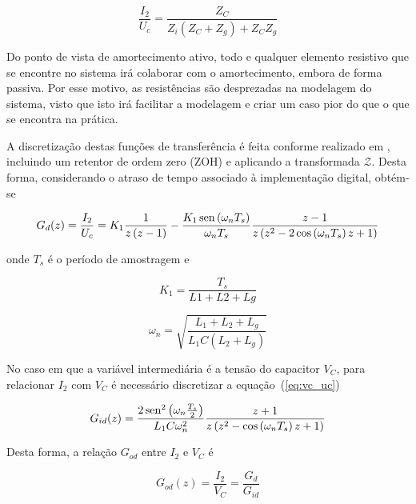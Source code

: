     \begin{equation}
        \frac{I_2}{U_c} = \frac{Z_C}{Z_i \left( Z_C + Z_g \right) + Z_C Z_g}
    \end{equation}

    Do ponto de vista de amortecimento ativo, todo e qualquer elemento resistivo
    que se encontre no sistema irá colaborar com o amortecimento, embora de forma
    passiva. Por esse motivo, as resistências são desprezadas na modelagem do
    sistema, visto que isto irá facilitar a modelagem e criar um caso pior do que
    o que se encontra na prática.

    A discretização destas funções de transferência é feita conforme realizado
    em \cite{ref:PARKER}, incluindo um retentor de ordem zero (ZOH) e aplicando a
    transformada $\mathcal{Z}$. Desta forma, considerando o atraso de tempo associado
    à implementação digital, obtém-se

    \begin{equation}
        G_d (z) = \frac{I_2}{U_c} = K_1 \frac{1}{z \left( z-1 \right)}
        - \frac{K_1 \operatorname{sen} \left( \omega_n T_s \right) }{\omega_n T_s}
        \frac{z-1}{z \left( z^2 - 2 \cos\left( \omega_n T_s \right) z +1 \right) }
    \end{equation}

    onde $T_s$ é o período de amostragem e

    \begin{equation*}
        K_1 = \frac{T_s}{L1 + L2 + Lg}
    \end{equation*}

    \begin{equation*}
        \omega_n = \sqrt{\frac{ L_1 + L_2 + L_g }{ L_1 C \left( L_2 + L_g \right)}}
    \end{equation*}

    No caso em que a variável intermediária é a tensão do capacitor $V_C$, para
    relacionar $I_2$ com $V_C$ é necessário discretizar a equação~(\ref{eq:vc_uc})

    \begin{equation}
        G_{id}(z) = \frac{2 \operatorname{sen}^2 \left( \omega_n \frac{T_s}{2} \right)}{L_1 C \omega_n^2}
            \frac{z+1}{z \left( z^2 - \cos \left( \omega_n T_s \right) z + 1 \right)}
    \end{equation}

    Desta forma, a relação $G_{od}$ entre $I_2$ e $V_C$ é

    \begin{equation}
        G_{od}(z) = \frac{I_2}{V_C} = \frac{G_d}{G_{id}}
    \end{equation}

